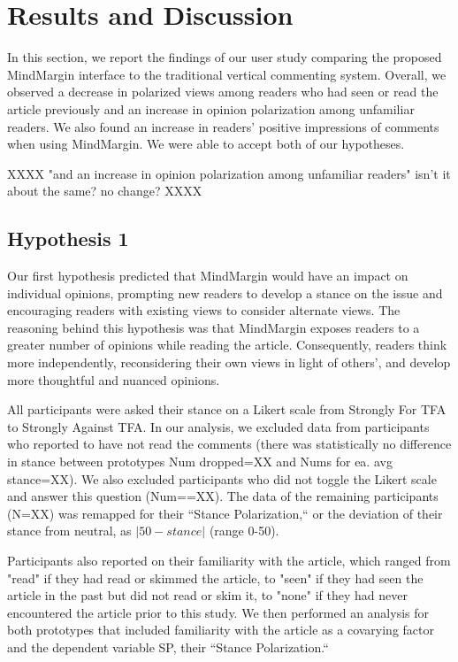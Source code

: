 \section{Results and Discussion}

In this section, we report the findings of our user study comparing the proposed MindMargin interface to the traditional vertical commenting system. Overall, we observed a decrease in polarized views among readers who had seen or read the article previously and an increase in opinion polarization among unfamiliar readers. We also found an increase in readers' positive impressions of comments when using MindMargin. We were able to accept both of our hypotheses.

XXXX "and an increase in opinion polarization among unfamiliar readers" isn't it about the same? no change? XXXX

\subsection{Hypothesis 1}
Our first hypothesis predicted that MindMargin would have an impact on individual opinions, prompting new readers to develop a stance on the issue and encouraging readers with existing views to consider alternate views. The reasoning behind this hypothesis was that MindMargin exposes readers to a greater number of opinions while reading the article. Consequently, readers think more independently, reconsidering their own views in light of others', and develop more thoughtful and nuanced opinions. 

All participants were asked their stance on a Likert scale from Strongly For TFA to Strongly Against TFA. In our analysis, we excluded data from participants who reported to have not read the comments (there was statistically no difference in stance between prototypes Num dropped=XX and Nums for ea. avg stance=XX). We also excluded participants who did not toggle the Likert scale and answer this question (Num==XX). The data of the remaining participants (N=XX) was remapped for their ``Stance Polarization,`` or the deviation of their stance from neutral, as $|50 - stance|$ (range 0-50). 

Participants also reported on their familiarity with the article, which ranged from "read" if they had read or skimmed the article, to "seen" if they had seen the article in the past but did not read or skim it, to "none" if they had never encountered the article prior to this study. We then performed an analysis for both prototypes that included familiarity with the article as a covarying factor and the dependent variable SP, their ``Stance Polarization.`` 

